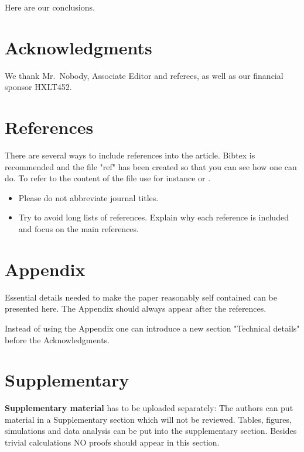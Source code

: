 \documentclass[a4paper,fleqn]{cas-sc} %
\begin{document}
Here are our conclusions.

\section*{Acknowledgments}

We thank Mr.~Nobody, Associate Editor and referees, as well as our financial sponsor HXLT452.

\section*{References}
There are several ways to include references into the article. Bibtex is recommended and the file "ref" has been created so that you can see how one can do. To refer to the content of the file use for instance
\cite{anderson1993totally,andersson,lauritzen1996graphical,gratzer2002general} or \cite{drton2008iterative}. 
\begin{itemize}
\item
Please do not abbreviate journal titles.
\item
Try to avoid long lists of references. Explain why each reference is included and focus on the main references.
\end{itemize}





\section*{Appendix}

Essential details needed to make the paper reasonably self contained can be presented here. The Appendix should always appear after the references.

\medskip
Instead of using the Appendix one can introduce a new section "Technical details" before the Acknowledgments.

\section*{Supplementary}
{\textbf{Supplementary material} has to be uploaded separately:} The authors can put material in a Supplementary section which will not be reviewed.  Tables, figures, simulations and data analysis can be put into the supplementary section. Besides trivial calculations NO proofs should appear in this section.
\end{document}
